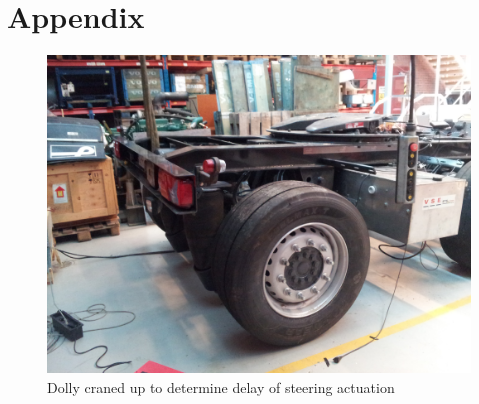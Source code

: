 \documentclass[ExampleMasters.tex]{subfiles}
\begin{document}
\clearpage
\appendix 
{}

\chapter{Appendix}
\label{chap:Appendix}

\begin{figure}[h]
\centering
\includegraphics[width=1\linewidth]{figures/dolly_craned_up}
\caption{Dolly craned up to determine delay of steering actuation}

\label{fig:dolly_craned_up}
\end{figure}
\end{document}

